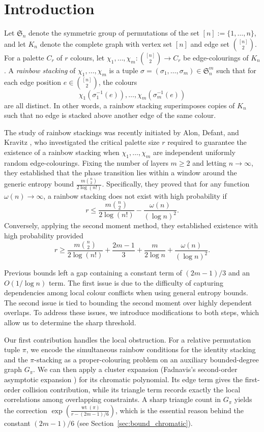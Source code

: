 \documentclass[11pt,reqno]{amsart}
\theoremstyle{definition}
\theoremstyle{remark}
\renewcommand\le{\leqslant}
\renewcommand\ge{\geqslant}
\renewcommand\to{\rightarrow}
\newcommand{\wt}{\operatorname{wt}}
\begin{document}
\section{Introduction}
Let $\mathfrak{S}_{n}$ denote the symmetric group of permutations of the set $[n] := \{1, \dots, n\}$, and let $K_{n}$ denote the complete graph with vertex set $[n]$ and edge set $\binom{[n]}{2}$. For a palette $C_r$ of $r$ colours, let $\chi_{1}, \dots, \chi_{m} : \binom{[n]}{2} \to C_r$ be edge-colourings of $K_{n}$. A \emph{rainbow stacking} of $\chi_{1}, \dots, \chi_{m}$ is a tuple $\sigma = (\sigma_{1}, \dots, \sigma_{m}) \in \mathfrak{S}_{n}^{m}$ such that for each edge position $e \in \binom{[n]}{2}$, the colours
\[ \chi_{1}(\sigma_{1}^{-1}(e)), \dots, \chi_{m}(\sigma_{m}^{-1}(e)) \]
are all distinct. In other words, a rainbow stacking superimposes copies of $K_n$ such that no edge is stacked above another edge of the same colour.

The study of rainbow stackings was recently initiated by Alon, Defant, and Kravitz \cite{ADK}, who investigated the critical palette size $r$ required to guarantee the existence of a rainbow stacking when $\chi_{1}, \dots, \chi_{m}$ are independent uniformly random edge-colourings. Fixing the number of layers $m \ge 2$ and letting $n \to \infty$, they established that the phase transition lies within a window around the generic entropy bound $\frac{m\binom{n}{2}}{2\log(n!)}$.
Specifically, they proved that for any function $\omega(n) \to \infty$, a rainbow stacking does not exist with high probability if 
$$r \le \frac{m\binom{n}{2}}{2\log(n!)} - \frac{\omega(n)}{(\log n)^{2}}.$$
Conversely, applying the second moment method, they established existence with high probability provided
\[ r \ge \frac{m\binom{n}{2}}{2\log(n!)} + \frac{2m-1}{3} + \frac{m}{2\log n} + \frac{\omega(n)}{(\log n)^{2}}. \]

Previous bounds left a gap containing a constant term of $(2m-1)/3$ and an $O(1/\log n)$ term. The first issue is due to the difficulty of capturing dependencies among local colour conflicts when using general entropy bounds. The second issue is tied to bounding the second moment over highly dependent overlaps. To address these issues, we introduce modifications to both steps, which allow us to determine the sharp threshold.

Our first contribution handles the local obstruction. For a relative permutation tuple $\pi$, we encode the simultaneous rainbow conditions for the identity stacking and the $\pi$-stacking as a proper-colouring problem on an auxiliary bounded-degree graph $G_\pi$.  We can then apply a cluster expansion (Fadnavis's second-order asymptotic expansion \cite{Fadnavis}) for its chromatic polynomial. Its edge term gives the first-order collision contribution, while its triangle term records exactly the local correlations among overlapping constraints. A sharp triangle count in $G_\pi$ yields the correction $\exp\left(\frac{\wt(\pi)}{r-(2m-1)/6}\right)$,
which is the essential reason behind the constant $(2m-1)/6$ (see Section~\ref{sec:bound_chromatic}).
\end{document}
